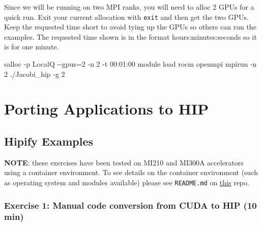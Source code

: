 \documentclass[
]{article}
\let\oldtexttt\texttt
\renewcommand{\texttt}[1]{
  \colorbox{Light}{\oldtexttt{#1}}
}
\newenvironment{Shaded}{}{}
\newcommand{\BuiltInTok}[1]{#1}
\newcommand{\ExtensionTok}[1]{#1}
\newcommand{\FunctionTok}[1]{\textcolor[rgb]{0.02,0.16,0.49}{#1}}
\newcommand{\KeywordTok}[1]{\textcolor[rgb]{0.00,0.44,0.13}{\textbf{#1}}}
\newcommand{\NormalTok}[1]{#1}
\newcommand{\VariableTok}[1]{\textcolor[rgb]{0.10,0.09,0.49}{#1}}
\begin{document}
\begin{Shaded}
\end{Shaded}

Since we will be running on two MPI ranks, you will need to alloc 2 GPUs
for a quick run. Exit your current allocation with \texttt{exit} and
then get the two GPUs. Keep the requested time short to avoid tying up
the GPUs so others can run the examples. The requested time shown is in
the format hours:minutes:seconds so it is for one minute.

\begin{Shaded}
\begin{Highlighting}[]
\ExtensionTok{salloc}\NormalTok{ {-}p LocalQ {-}{-}gpus=2 {-}n 2 {-}t 00:01:00}
\ExtensionTok{module}\NormalTok{ load rocm openmpi}
\ExtensionTok{mpirun}\NormalTok{ {-}n 2 ./Jacobi\_hip {-}g 2}
\end{Highlighting}
\end{Shaded}

\pagebreak

\hypertarget{porting-applications-to-hip}{%
\section{Porting Applications to
HIP}\label{porting-applications-to-hip}}

\hypertarget{hipify-examples}{%
\subsection{Hipify Examples}\label{hipify-examples}}

\textbf{NOTE}: these exercises have been tested on MI210 and MI300A
accelerators using a container environment. To see details on the
container environment (such as operating system and modules available)
please see \texttt{README.md} on
\href{https://github.com/amd/HPCTrainingDock}{this} repo.

\hypertarget{exercise-1-manual-code-conversion-from-cuda-to-hip-10-min}{%
\subsubsection{Exercise 1: Manual code conversion from CUDA to HIP (10
min)}\label{exercise-1-manual-code-conversion-from-cuda-to-hip-10-min}}
\end{document}
